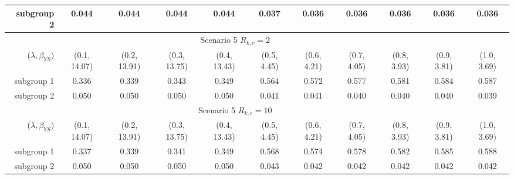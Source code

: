 \begin{tabular}{rcccc>{\columncolor[gray]{0.9}}cccccc}
subgroup 2              & 0.044        & 0.044        & 0.044        & 0.044        & 0.037       & 0.036       & 0.036       & 0.036       & 0.036       & 0.036       \\
\bottomrule  
\multicolumn{10}{c}{Scenario 5 $R_{k,c} = 2$}\\ 
\midrule 
($\lambda, \beta_{YS})$ & (0.1, 14.07) & (0.2, 13.91) & (0.3, 13.75) & (0.4, 13.43) & (0.5, 4.45) & (0.6, 4.21) & (0.7, 4.05) & (0.8, 3.93) & (0.9, 3.81) & (1.0, 3.69) \\
subgroup 1              & 0.336        & 0.339        & 0.343        & 0.349        & 0.564       & 0.572       & 0.577       & 0.581       & 0.584       & 0.587       \\
subgroup 2              & 0.050        & 0.050        & 0.050        & 0.050        & 0.041       & 0.041       & 0.040       & 0.040       & 0.040       & 0.039       \\
\bottomrule  
\multicolumn{10}{c}{Scenario 5 $R_{k,c} = 10$}\\ 
\midrule 
($\lambda, \beta_{YS})$ & (0.1, 14.07) & (0.2, 13.91) & (0.3, 13.75) & (0.4, 13.43) & (0.5, 4.45) & (0.6, 4.21) & (0.7, 4.05) & (0.8, 3.93) & (0.9, 3.81) & (1.0, 3.69) \\
subgroup 1              & 0.337        & 0.339        & 0.341        & 0.349        & 0.568       & 0.574       & 0.578       & 0.582       & 0.585       & 0.588       \\
subgroup 2              & 0.050        & 0.050        & 0.050        & 0.050        & 0.043       & 0.042       & 0.042       & 0.042       & 0.042       & 0.042       \\
\bottomrule  

\end{tabular}

 
